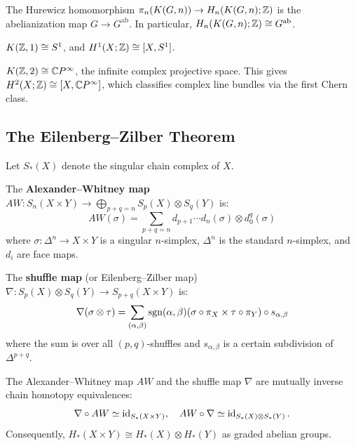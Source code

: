 \begin{theorem}
The Hurewicz homomorphism $\pi_n(K(G,n)) \to H_n(K(G,n); \mathbb{Z})$ is the abelianization map $G \to G^{\mathrm{ab}}$. In particular, $H_n(K(G,n); \mathbb{Z}) \cong G^{\mathrm{ab}}$.
\end{theorem}

\begin{example}
$K(\mathbb{Z},1) \cong S^1$, and $H^1(X;\mathbb{Z}) \cong [X, S^1]$.
\end{example}

\begin{example}
$K(\mathbb{Z},2) \cong \mathbb{C}P^\infty$, the infinite complex projective space. This gives $H^2(X;\mathbb{Z}) \cong [X, \mathbb{C}P^\infty]$, which classifies complex line bundles via the first Chern class.
\end{example}

\subsection{The Eilenberg--Zilber Theorem}

Let $S_*(X)$ denote the singular chain complex of $X$.

\begin{definition}
The \textbf{Alexander--Whitney map} $AW: S_n(X \times Y) \to \bigoplus_{p+q=n} S_p(X) \otimes S_q(Y)$ is:
\[
AW(\sigma) = \sum_{p+q=n} d_{p+1}\cdots d_n(\sigma) \otimes d_0^q(\sigma)
\]
where $\sigma: \Delta^n \to X \times Y$ is a singular $n$-simplex, $\Delta^n$ is the standard $n$-simplex, and $d_i$ are face maps.
\end{definition}

\begin{definition}
The \textbf{shuffle map} (or Eilenberg--Zilber map) $\nabla: S_p(X) \otimes S_q(Y) \to S_{p+q}(X \times Y)$ is:
\[
\nabla(\sigma \otimes \tau) = \sum_{(\alpha,\beta)} \operatorname{sgn}(\alpha,\beta) (\sigma \circ \pi_X \times \tau \circ \pi_Y) \circ s_{\alpha,\beta}
\]
where the sum is over all $(p,q)$-shuffles and $s_{\alpha,\beta}$ is a certain subdivision of $\Delta^{p+q}$.
\end{definition}

\begin{theorem}
The Alexander--Whitney map $AW$ and the shuffle map $\nabla$ are mutually inverse chain homotopy equivalences:
\[
\nabla \circ AW \simeq \operatorname{id}_{S_*(X \times Y)}, \quad AW \circ \nabla \simeq \operatorname{id}_{S_*(X) \otimes S_*(Y)}.
\]
Consequently, $H_*(X \times Y) \cong H_*(X) \otimes H_*(Y)$ as graded abelian groups.
\end{theorem}

